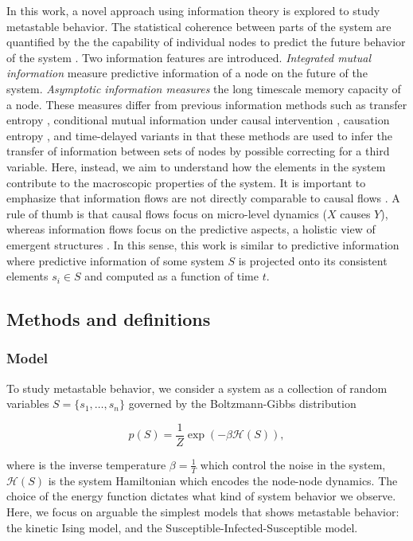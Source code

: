 \documentclass[a4paper, 11pt, twocolumn]{article}
\begin{document}
In this work,  a novel approach using  information theory is
explored  to  study  metastable  behavior.  The  statistical
coherence between parts of the  system are quantified by the
the  capability of  individual nodes  to predict  the future
behavior  of  the  system \cite{Lizier2013}.  Two  information
features  are  introduced. \emph{Integrated  mutual  information}
measure predictive  information of a  node on the  future of
the  system.  \emph{Asymptotic  information  measures}  the  long
timescale memory  capacity of a node.  These measures differ
from previous  information methods such as  transfer entropy
\cite{Schreiber}, conditional mutual  information under causal
intervention \cite{Ay2008},  causation entropy \cite{Runge2019},
and time-delayed variants \cite{Li2008}  in that these methods
are used to  infer the transfer of  information between sets
of nodes by possible correcting  for a third variable. Here,
instead, we aim to understand how the elements in the system
contribute to  the macroscopic properties of  the system. It
is  important to  emphasize that  information flows  are not
directly comparable  to causal flows \cite{James2016}.  A rule
of thumb is that causal  flows focus on micro-level dynamics
(\(X\) causes \(Y\)), whereas information flows focus on the
predictive aspects,  a holistic view of  emergent structures
\cite{Lizier2013}.  In this  sense,  this work  is similar  to
predictive  information   \cite{Bialek1999}  where  predictive
information  of  some system  \(S\)  is  projected onto  its
consistent elements \(s_i  \in S\) and computed  as a function
of time \(t\).

\subsection{Methods and definitions}
\label{sec:orgc2848a7}
\subsubsection{Model}
\label{sec:org5382bb5}
To  study metastable  behavior, we  consider a  system as  a
collection of  random variables \(S =  \{s_1, \dots, s_n\}\)
governed by the Boltzmann-Gibbs distribution

\[p(S)    =     \frac{1}{Z}    \exp(- \beta \mathcal{H}(S) ),\]

where is  the inverse temperature \(\beta  = \frac{1}{T}\) which
control the  noise in the system,  \(\mathcal{H}(S)\) is the
system Hamiltonian which encodes the node-node dynamics. The
choice of the  energy function dictates what  kind of system
behavior we observe. Here, we focus on arguable the simplest
models  that shows  metastable behavior:  the kinetic  Ising
model, and the Susceptible-Infected-Susceptible model.
\end{document}
